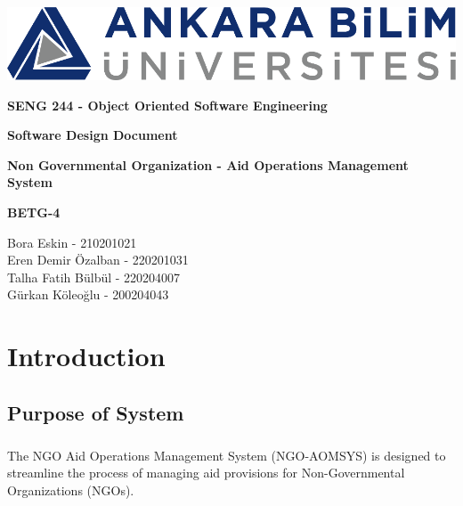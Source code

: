 \documentclass[a4paper,12pt]{report}
\begin{document}
	
	\begin{titlepage}
		\begin{center}
			\includegraphics{ankara_bilim.png}
		\end{center}
		\vspace{1cm}
		\begin{center}
			\LARGE
			\textbf{SENG 244 - Object Oriented Software Engineering}
		\end{center}
		\vspace{1cm}
		\begin{center}
			\Large
			\textbf{Software Design Document}
		\end{center}
		\vspace{1cm}
		\begin{center}
			\Large
			\textbf{Non Governmental Organization - Aid Operations Management System}
		\end{center}
		\vspace{2cm}
		\begin{center}
			\large
			\textbf{BETG-4}
		\end{center}
		\vspace{1cm}
		\begin{center}
			\large
			Bora Eskin - 210201021\\
			Eren Demir Özalban - 220201031\\
			Talha Fatih Bülbül - 220204007\\
			Gürkan Köleoğlu - 200204043
		\end{center}
	\end{titlepage}
	
	\tableofcontents
	
	\chapter{Introduction}
		\section{Purpose of System}
  			\paragraph{}The NGO Aid Operations Management System (NGO-AOMSYS) is designed to streamline the process of managing aid provisions for Non-Governmental Organizations (NGOs).
\end{document}
